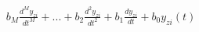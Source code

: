 \documentclass[preview]{standalone}
\begin{document}
\begin{align*}
b_M\frac{d^My_{zi}}{dt^M} +...+b_2\frac{d^2y_{zi}}{dt^2}+b_1\frac{dy_{zi}}{dt} + b_0y_{zi}(t)
\end{align*}
\end{document}

